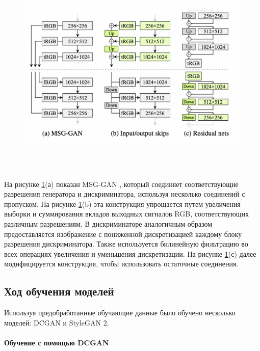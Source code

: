 \begin{figure}
    \centering
    \includegraphics[height=100mm]{fig/stylegan2_generator.png}
    \caption{}
    \label{fig.stylegan2_generator}
\end{figure}

На рисунке {\color{blue} \ref{fig.stylegan2_generator}}(а) показан MSG-GAN \cite{MSG_GAN}, который соединяет соответствующие разрешения генератора и дискриминатора, используя несколько соединений с пропуском. На рисунке {\color{blue} \ref{fig.stylegan2_generator}}(b) эта конструкция упрощается путем увеличения выборки и суммирования вкладов выходных сигналов RGB, соответствующих различным разрешениям. В дискриминаторе аналогичным образом предоставляется изображение с пониженной дискретизацией каждому блоку разрешения дискриминатора. Также используется билинейную фильтрацию во всех операциях увеличения и уменьшения дискретизации. На рисунке {\color{blue} \ref{fig.stylegan2_generator}}(с) далее модифицируется конструкция, чтобы использовать остаточные соединения\cite{StyleGAN2}.

\subsection{Ход обучения моделей}

Используя предобработанные обучающие данные было обучено несколько моделей: DCGAN и StyleGAN 2.

\paragraph{Обучение с помощью DCGAN}

